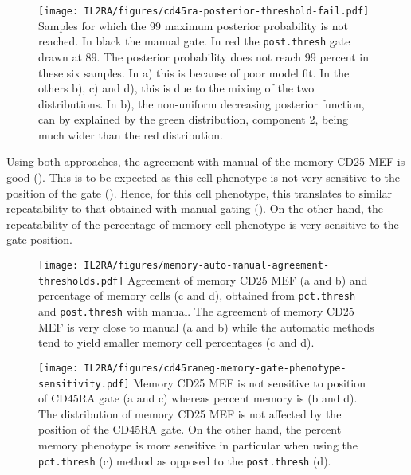 \begin{figure}[h]
\centering
  \texttt{[image: IL2RA/figures/cd45ra-posterior-threshold-fail.pdf]}
{Samples for which the 99 maximum posterior probability is not reached.}
{
  In black the manual gate.  In red the \texttt{post.thresh} gate drawn at $89$.
  The posterior probability does not reach 99 percent in these six samples.
  In a) this is because of poor model fit.
  In the others b), c) and d), this is due to the mixing of the two distributions.
  In b), the non-uniform decreasing posterior function, can by explained by the green distribution, component 2,
  being much wider than the red distribution.
}
\end{figure}


Using both approaches, the agreement with manual of the memory CD25 MEF is good ().
This is to be expected as this cell phenotype is not very sensitive to the position of the  gate
().  
Hence, for this cell phenotype, this translates to similar repeatability to that obtained with manual gating ().
On the other hand, the repeatability of the percentage of memory cell phenotype is very sensitive to the gate position.


\begin{figure}[h]
 \centering
 \texttt{[image: IL2RA/figures/memory-auto-manual-agreement-thresholds.pdf]}
 {Agreement of memory CD25 MEF (a and b) and percentage of memory cells (c and d), obtained from \texttt{pct.thresh} and \texttt{post.thresh} with manual.}
 {
   The agreement of memory CD25 MEF is very close to manual (a and b) while the automatic methods tend to yield smaller memory cell percentages (c and d).
 }
\end{figure} 

\begin{figure}[h]
  \texttt{[image: IL2RA/figures/cd45raneg-memory-gate-phenotype-sensitivity.pdf]}
{ Memory CD25 MEF is not sensitive to position of CD45RA gate (a and c) whereas percent memory is (b and d). }
{
  The distribution of memory CD25 MEF is not affected by the position of the CD45RA gate.
  On the other hand, the percent memory phenotype is more sensitive in particular when using the \texttt{pct.thresh} (c)
  method as opposed to the \texttt{post.thresh} (d).
}
\end{figure}

